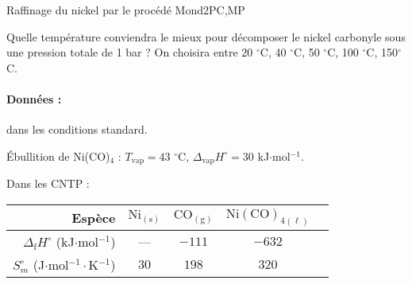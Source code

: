 \begin{exercise}{Raffinage du nickel par le procédé Mond}{2}{PC,MP}
\begin{questions}
    \question Quelle température conviendra le mieux pour décomposer le nickel carbonyle sous une pression totale de 1 bar ? On choisira entre 20 $^\circ$C, 40 $^\circ$C, 50 $^\circ$C, 100 $^\circ$C, 150$^\circ$C.
    
    \paragraph{Données :} dans les conditions standard.
    
    \'Ebullition de Ni(CO)$_4$ : $T_\text{vap} = 43$ $^\circ$C, $\Delta_\text{vap}H^\circ = 30$ kJ$\cdot$mol$^{-1}$.
    
    Dans les CNTP :
    \begin{center}
\begin{table}[H]
    \qquad\begin{tabular}{r|cccc}
        Espèce & $\mathrm{Ni_{(s)}}$ & $\mathrm{CO_{(g)}}$ & $\mathrm{Ni(CO)_{4 (\ell)}}$ \\ \hline\hline
        $\Delta_\text{f}H^\circ$ (kJ$\cdot$mol$^{-1}$) & --- & $-111$ & $-632$ \\
        $S_m^\circ$ (J$\cdot$mol$^{-1}\cdot$K$^{-1}$) & $30$ & $198$ & $320$ \\ \hline
    \end{tabular}
\end{table}
    \end{center}
\end{questions}

\end{exercise}




